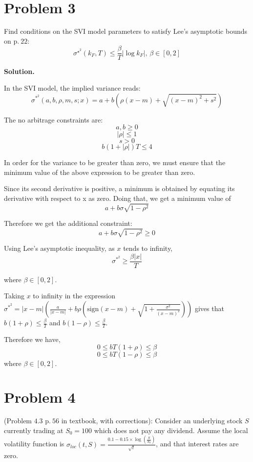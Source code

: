 \documentclass[12pt]{article}
\newenvironment{solution}{\vspace{0.2cm} \textbf{Solution.}}{}
\begin{document}
\section*{Problem 3}
Find conditions on the SVI model parameters to satisfy Lee’s asymptotic bounds on p$.\ 22$: 
$$\sigma^{\star^2} (k_F,T) \leq \frac{\beta}{T} |\log{k_F}|,\, \beta \in [0,2]$$

	\begin{solution}

	In the SVI model, the implied variance reads:
	$$ \sigma^{*^2}(a,b,\rho,m,s; x) = a + b(\rho(x-m) + \sqrt{(x-m)^2 + s^2})$$
	
	The no arbitrage constraints are: 
	$$ a,b \geq 0$$
	$$ |\rho| \leq 1 $$
	$$ s > 0 $$
	$$ b(1 + |\rho|)T \leq 4$$
	
	In order for the variance to be greater than zero, we must ensure that the minimum value of the above expression to be greater than zero.
	
	Since its second derivative is positive, a minimum is obtained by equating its derivative with respect to x as zero. Doing that, we get a minimum value of $$a + b\sigma\sqrt{1-\rho^2}$$
	
	Therefore we get the additional constraint: $$a + b\sigma\sqrt{1-\rho^2} \geq 0$$
	
	Using Lee's asymptotic inequality, as $x$ tends to infinity,
	$$ \sigma^{*^2} \geq \frac{\beta|x|}{T}$$
	
	where $\beta \in [0,2]$.
	
	Taking $x$ to infinity in the expression $\sigma^{*^2} = |x-m|\left(\frac{a}{|x-m|} + b\rho \left(\text{sign}(x-m) + \sqrt{1 + \frac{\sigma^2}{(x-m)^2}} \right)\right)$
	gives that $b(1+\rho) \leq \frac{\beta}{T}$ and $b(1-\rho) \leq \frac{\beta}{T}$.
	
	Therefore we have, $$0 \leq bT(1+\rho) \leq \beta$$ $$0 \leq bT(1-\rho) \leq \beta$$ where $\beta \in [0,2]$.

	\end{solution}

\newpage

\section*{Problem 4}
(Problem $4.3$ p$.\ 56$ in textbook, with corrections): Consider an underlying stock $S$ currently trading at $S_0 = 100$ which does not pay any dividend. Assume the local volatility function is $\sigma_{loc} (t, S) = \frac{0.1 - 0.15 \times \log\left(\frac{S}{S_0}\right)}{\sqrt{t}}$, and that interest rates are zero.
\end{document}
